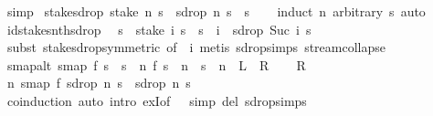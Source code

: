 \begin{isabellebody}
\isamarkupfalse%
\ simp%
\endisatagproof
{\isafoldproof}%
%
\isadelimproof
\isanewline
%
\endisadelimproof
\isanewline
{}\isamarkupfalse%
\ stake{\isacharunderscore}sdrop{\isacharcolon}\ {\isachardoublequoteopen}stake\ n\ s\ {\isacharat}{\isacharminus}\ sdrop\ n\ s\ {\isacharequal}\ s{\isachardoublequoteclose}\isanewline
%
\isadelimproof
\ \ %
\endisadelimproof
%
\isatagproof
{}\isamarkupfalse%
\ {\isacharparenleft}induct\ n\ arbitrary{\isacharcolon}\ s{\isacharparenright}\ auto%
\endisatagproof
{\isafoldproof}%
%
\isadelimproof
\isanewline
%
\endisadelimproof
\isanewline
{}\isamarkupfalse%
\ id{\isacharunderscore}stake{\isacharunderscore}snth{\isacharunderscore}sdrop{\isacharcolon}\isanewline
\ \ {\isachardoublequoteopen}s\ {\isacharequal}\ stake\ i\ s\ {\isacharat}{\isacharminus}\ s\ {\isacharbang}{\isacharbang}\ i\ {\isacharhash}{\isacharhash}\ sdrop\ {\isacharparenleft}Suc\ i{\isacharparenright}\ s{\isachardoublequoteclose}\isanewline
%
\isadelimproof
\ \ %
\endisadelimproof
%
\isatagproof
{}\isamarkupfalse%
\ {\isacharparenleft}subst\ stake{\isacharunderscore}sdrop{\isacharbrackleft}symmetric{\isacharcomma}\ of\ {\isacharunderscore}\ i{\isacharbrackright}{\isacharparenright}\ {\isacharparenleft}metis\ sdrop{\isacharunderscore}simps\ stream{\isachardot}collapse{\isacharparenright}%
\endisatagproof
{\isafoldproof}%
%
\isadelimproof
\isanewline
%
\endisadelimproof
\isanewline
{}\isamarkupfalse%
\ smap{\isacharunderscore}alt{\isacharcolon}\ {\isachardoublequoteopen}smap\ f\ s\ {\isacharequal}\ s{\isacharprime}\ {\isasymlongleftrightarrow}\ {\isacharparenleft}{\isasymforall}n{\isachardot}\ f\ {\isacharparenleft}s\ {\isacharbang}{\isacharbang}\ n{\isacharparenright}\ {\isacharequal}\ s{\isacharprime}\ {\isacharbang}{\isacharbang}\ n{\isacharparenright}{\isachardoublequoteclose}\ {\isacharparenleft}\ {\isachardoublequoteopen}{\isacharquery}L\ {\isacharequal}\ {\isacharquery}R{\isachardoublequoteclose}{\isacharparenright}\isanewline
%
\isadelimproof
%
\endisadelimproof
%
\isatagproof
{}\isamarkupfalse%
\isanewline
\ \ \isamarkupfalse%
\ {\isacharquery}R\isanewline
\ \ \isamarkupfalse%
\ \isamarkupfalse%
\ {\isachardoublequoteopen}{\isasymAnd}n{\isachardot}\ smap\ f\ {\isacharparenleft}sdrop\ n\ s{\isacharparenright}\ {\isacharequal}\ sdrop\ n\ s{\isacharprime}{\isachardoublequoteclose}\isanewline
\ \ \ \ \isamarkupfalse%
\ coinduction\ {\isacharparenleft}auto\ intro{\isacharcolon}\ exI{\isacharbrackleft}of\ {\isacharunderscore}\ {}{\isacharbrackright}\ simp\ del{\isacharcolon}\ sdrop{\isachardot}simps{\isacharparenleft}{}{\isacharparenright}{\isacharparenright}\isanewline

\end{isabellebody}
